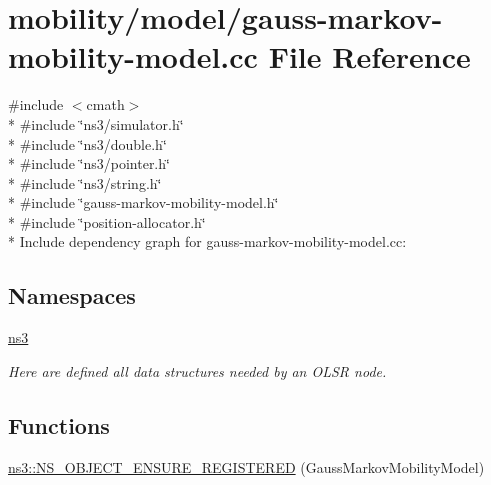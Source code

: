 \hypertarget{gauss-markov-mobility-model_8cc}{}\section{mobility/model/gauss-\/markov-\/mobility-\/model.cc File Reference}
\label{gauss-markov-mobility-model_8cc}
{\ttfamily \#include $<$cmath$>$}\\*
{\ttfamily \#include \char`\"{}ns3/simulator.\+h\char`\"{}}\\*
{\ttfamily \#include \char`\"{}ns3/double.\+h\char`\"{}}\\*
{\ttfamily \#include \char`\"{}ns3/pointer.\+h\char`\"{}}\\*
{\ttfamily \#include \char`\"{}ns3/string.\+h\char`\"{}}\\*
{\ttfamily \#include \char`\"{}gauss-\/markov-\/mobility-\/model.\+h\char`\"{}}\\*
{\ttfamily \#include \char`\"{}position-\/allocator.\+h\char`\"{}}\\*
Include dependency graph for gauss-\/markov-\/mobility-\/model.cc\+:
\subsection*{Namespaces}
\begin{DoxyCompactItemize}
\item 
 \hyperlink{namespacens3}{ns3}
\begin{DoxyCompactList}\small\item\em Here are defined all data structures needed by an O\+L\+SR node. \end{DoxyCompactList}\end{DoxyCompactItemize}
\subsection*{Functions}
\begin{DoxyCompactItemize}
\item 
\hyperlink{namespacens3_a080bcbacd8eba58210d9331c50112f50}{ns3\+::\+N\+S\+\_\+\+O\+B\+J\+E\+C\+T\+\_\+\+E\+N\+S\+U\+R\+E\+\_\+\+R\+E\+G\+I\+S\+T\+E\+R\+ED} (Gauss\+Markov\+Mobility\+Model)
\end{DoxyCompactItemize}
